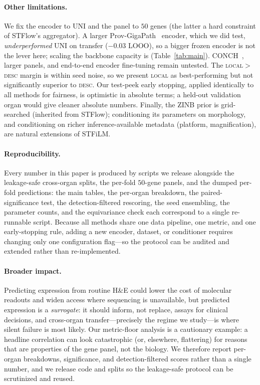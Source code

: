 \documentclass[10pt,twocolumn,letterpaper]{article}
\begin{document}
\paragraph{Other limitations.} We fix the encoder to UNI and the panel to $50$ genes (the latter a
hard constraint of STFlow's aggregator). A larger Prov-GigaPath~\cite{gigapath} encoder, which we
did test, \emph{underperformed} UNI on transfer ($-0.03$ LOOO), so a bigger frozen encoder is not
the lever here; scaling the backbone capacity is (Table~\ref{tab:main}). CONCH~\cite{conch}, larger
panels, and end-to-end encoder fine-tuning remain untested. The \textsc{local}$>$\textsc{desc} margin is
within seed noise, so we present \textsc{local} as best-performing but not significantly superior to
\textsc{desc}. Our test-peek early stopping, applied identically to all methods for fairness, is
optimistic in absolute terms; a held-out validation organ would give cleaner absolute numbers.
Finally, the ZINB prior is grid-searched (inherited from STFlow); conditioning its parameters on
morphology, and conditioning on richer inference-available metadata (platform, magnification), are
natural extensions of STFiLM.

\paragraph{Reproducibility.} Every number in this paper is produced by scripts we release
alongside the leakage-safe cross-organ splits, the per-fold $50$-gene panels, and the dumped
per-fold predictions: the main tables, the per-organ breakdown, the paired-significance test, the
detection-filtered rescoring, the seed ensembling, the parameter counts, and the equivariance check
each correspond to a single re-runnable script. Because all methods share one data pipeline, one
metric, and one early-stopping rule, adding a new encoder, dataset, or conditioner requires changing
only one configuration flag---so the protocol can be audited and extended rather than re-implemented.

\paragraph{Broader impact.} Predicting expression from routine H\&E could lower the cost of
molecular readouts and widen access where sequencing is unavailable, but predicted expression is a
\emph{surrogate}: it should inform, not replace, assays for clinical decisions, and cross-organ
transfer---precisely the regime we study---is where silent failure is most likely. Our metric-floor
analysis is a cautionary example: a headline correlation can look catastrophic (or, elsewhere,
flattering) for reasons that are properties of the gene panel, not the biology. We therefore report
per-organ breakdowns, significance, and detection-filtered scores rather than a single number, and
we release code and splits so the leakage-safe protocol can be scrutinized and reused.
\end{document}
